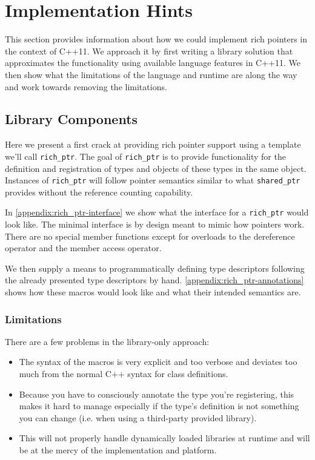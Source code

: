 \section{Implementation Hints}

This section provides information about how we could implement rich pointers
in the context of C++11. We approach it by first writing a library solution
that approximates the functionality using available language features in
C++11. We then show what the limitations of the language and runtime are along
the way and work towards removing the limitations.

\subsection{Library Components}

Here we present a first crack at providing rich pointer support using a
template we'll call \verb+rich_ptr+. The goal of \verb+rich_ptr+ is to provide
functionality for the definition and registration of types and objects of
these types in the same object. Instances of \verb+rich_ptr+ will follow
pointer semantics similar to what \verb+shared_ptr+ provides without the
reference counting capability.

In \autoref{appendix:rich_ptr-interface} we show what the interface for a
\verb+rich_ptr+ would look like. The minimal interface is by design meant to
mimic how pointers work. There are no special member functions except for
overloads to the dereference operator and the member access operator.

We then supply a means to programmatically defining type descriptors following
the already presented type descriptors by hand.
\autoref{appendix:rich_ptr-annotations} shows how these macros would look like
and what their intended semantics are.

\subsubsection{Limitations}

There are a few problems in the library-only approach:

\begin{itemize}

 \item The syntax of the macros is very explicit and too verbose and deviates
too much from the normal C++ syntax for class definitions.

 \item Because you have to consciously annotate the type you’re registering,
this makes it hard to manage especially if the type’s definition is not
something you can change (i.e. when using a third-party provided library).

 \item This will not properly handle dynamically loaded libraries at runtime
and will be at the mercy of the implementation and platform.

\end{itemize}

